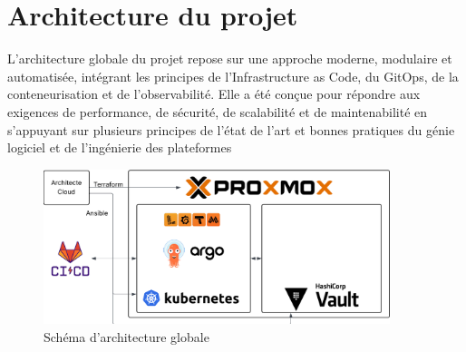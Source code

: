 



\section{Architecture du projet}

L'architecture globale du projet repose sur une approche moderne, modulaire et automatisée, intégrant les principes de l'Infrastructure as Code, du GitOps, de la conteneurisation et de l'observabilité. Elle a été conçue pour répondre aux exigences de performance, de sécurité, de scalabilité et de maintenabilité en s'appuyant sur plusieurs principes de l’état de l’art et bonnes pratiques du génie logiciel et de l’ingénierie des plateformes
\begin{figure}[H]
	\centering
	\includegraphics[width=0.9\textwidth]{figures/architecture-globale.png}
	\caption{Schéma d'architecture globale}
\end{figure}

